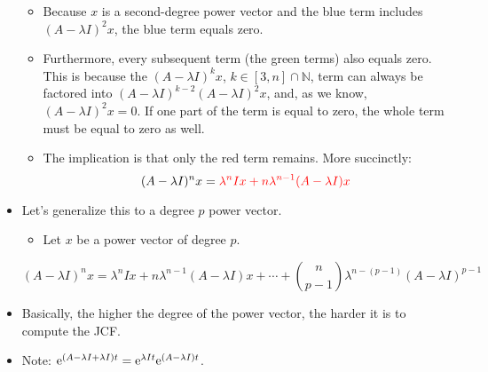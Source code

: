 \documentclass{article}
\begin{document}
\begin{itemize}
\begin{itemize}
\begin{equation*}
        \end{equation*}
        \item Because $x$ is a second-degree power vector and the blue term includes $(A-\lambda I)^2x$, the blue term equals zero.
        \item Furthermore, every subsequent term (the green terms) also equals zero. This is because the $(A-\lambda I)^kx$, $k\in[3,n]\cap\mathbb{N}$, term can always be factored into $(A-\lambda I)^{k-2}(A-\lambda I)^2x$, and, as we know, $(A-\lambda I)^2x=0$. If one part of the term is equal to zero, the whole term must be equal to zero as well.
        \item The implication is that only the red term remains. More succinctly:
        \begin{equation*}
            (A-\lambda I)^nx = {\color{red}\lambda^nIx+n\lambda^{n-1}(A-\lambda I)x}
        \end{equation*}
    \end{itemize}
    \item Let's generalize this to a degree $p$ power vector.
    \begin{itemize}
        \item Let $x$ be a power vector of degree $p$.
    \end{itemize}
    \begin{equation*}
        (A-\lambda I)^nx = \lambda^nIx+n\lambda^{n-1}(A-\lambda I)x+\cdots+\binom{n}{p-1}\lambda^{n-(p-1)}(A-\lambda I)^{p-1}
    \end{equation*}
    \item Basically, the higher the degree of the power vector, the harder it is to compute the JCF.
    \item Note: $\text{e}^{(A-\lambda I+\lambda I)t}=\text{e}^{\lambda It}\text{e}^{(A-\lambda I)t}$.
\end{itemize}
\end{document}
